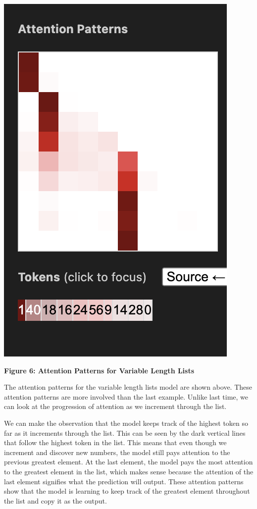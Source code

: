 \documentclass{article}
\begin{document}
\begin{center}
    \includegraphics[scale=0.4]{images/att_variable3.png}

    \textbf{Figure 6: Attention Patterns for Variable Length Lists}
\end{center}

The attention patterns for the variable length lists model are shown above. These attention patterns are more involved than the last example. Unlike last time, we can look at the progression of attention as we increment through the list. 

We can make the observation that the model keeps track of the highest token so far as it increments through the list. This can be seen by the dark vertical lines that follow the highest token in the list. This means that even though we increment and discover new numbers, the model still pays attention to the previous greatest element. At the last element, the model pays the most attention to the greatest element in the list, which makes sense because the attention of the last element signifies what the prediction will output. These attention patterns show that the model is learning to keep track of the greatest element throughout the list and copy it as the output.
\end{document}
